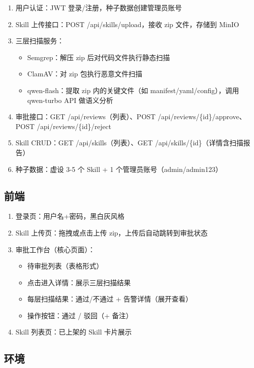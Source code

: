 \documentclass[11pt,a4paper]{article}
\begin{document}
\begin{enumerate}[nosep]
  \item 用户认证：JWT 登录/注册，种子数据创建管理员账号
  \item Skill 上传接口：POST /api/skills/upload，接收 zip 文件，存储到 MinIO
  \item 三层扫描服务：
    \begin{itemize}[nosep]
      \item Semgrep：解压 zip 后对代码文件执行静态扫描
      \item ClamAV：对 zip 包执行恶意文件扫描
      \item qwen-flash：提取 zip 内的关键文件（如 manifest/yaml/config），调用 qwen-turbo API 做语义分析
    \end{itemize}
  \item 审批接口：GET /api/reviews（列表）、POST /api/reviews/\{id\}/approve、POST /api/reviews/\{id\}/reject
  \item Skill CRUD：GET /api/skills（列表）、GET /api/skills/\{id\}（详情含扫描报告）
  \item 种子数据：虚设 3-5 个 Skill + 1 个管理员账号（admin/admin123）
\end{enumerate}

\subsection{前端}

\begin{enumerate}[nosep]
  \item 登录页：用户名+密码，黑白灰风格
  \item Skill 上传页：拖拽或点击上传 zip，上传后自动跳转到审批状态
  \item 审批工作台（核心页面）：
    \begin{itemize}[nosep]
      \item 待审批列表（表格形式）
      \item 点击进入详情：展示三层扫描结果
      \item 每层扫描结果：通过/不通过 + 告警详情（展开查看）
      \item 操作按钮：通过 / 驳回（+ 备注）
    \end{itemize}
  \item Skill 列表页：已上架的 Skill 卡片展示
\end{enumerate}

\subsection{环境}
\end{document}
